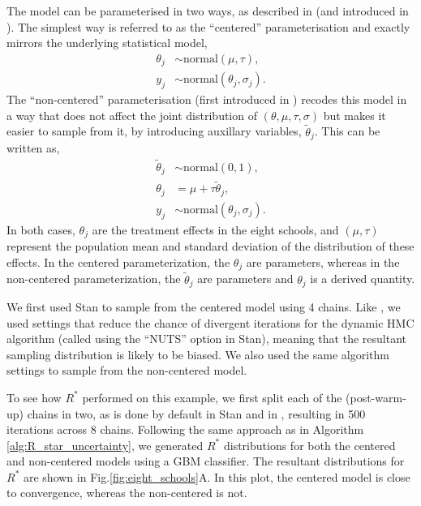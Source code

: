 \documentclass[ba]{imsart}
\numberwithin{equation}{section}
\theoremstyle{plain}
\begin{document}
The model can be parameterised in two ways, as described in \cite{vehtari2019rank} (and introduced in \cite{van2001art}). The simplest way is referred to as the ``centered'' parameterisation and exactly mirrors the underlying statistical model,
%
\begin{align*}
\theta_j &\sim \text{normal}(\mu, \tau), \\
y_j &\sim \text{normal}(\theta_j, \sigma_j).
\end{align*}
%
The ``non-centered'' parameterisation (first introduced in \cite{van2001art}) recodes this model in a way that does not affect the joint distribution of $(\theta, \mu, \tau, \sigma)$ but makes it easier to sample from it, by introducing auxillary variables, $\tilde \theta_j$. This can be written as,
%
\begin{align*}
\tilde{\theta}_j &\sim \text{normal}(0, 1), \\
\theta_j &= \mu + \tau \tilde{\theta}_j,\\
y_j &\sim \text{normal}(\theta_j, \sigma_j).
\end{align*}
%
In both cases, $\theta_j$ are the treatment effects in the eight schools, and $(\mu, \tau)$ represent the population mean and standard deviation of the distribution of these effects. In the centered parameterization, the $\theta_j$ are parameters, whereas in the non-centered parameterization, the $\tilde{\theta}_j$ are parameters and $\theta_j$ is a derived quantity.

We first used Stan \citep{carpenter2017stan} to sample from the centered model using 4 chains. Like \cite{vehtari2019rank}, we used settings that reduce the chance of divergent iterations for the dynamic HMC algorithm \citep{betancourt2017conceptual} (called using the ``NUTS'' option in Stan), meaning that the resultant sampling distribution is likely to be biased. We also used the same algorithm settings to sample from the non-centered model.

To see how $R^*$ performed on this example, we first split each of the (post-warm-up) chains in two, as is done by default in Stan \citep{carpenter2017stan} and in \cite{vehtari2019rank}, resulting in 500 iterations across 8 chains. Following the same approach as in Algorithm \ref{alg:R_star_uncertainty}, we generated $R^*$ distributions for both the centered and non-centered models using a GBM classifier. The resultant distributions for $R^*$ are shown in Fig.\ref{fig:eight_schools}A. In this plot, the centered model is close to convergence, whereas the non-centered is not.
\end{document}
